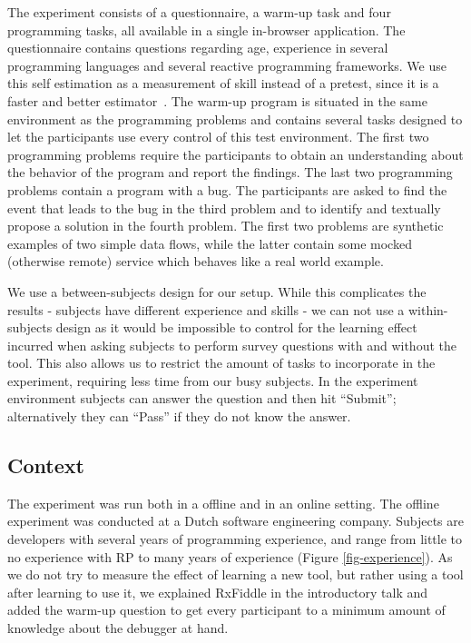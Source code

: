 The experiment consists of a questionnaire, a warm-up task and four programming tasks, all available in a single in-browser application. The questionnaire contains questions regarding age, experience in several programming languages and several reactive programming frameworks. We use this self estimation as a measurement of skill instead of a pretest, since it is a faster and better estimator~\cite{kleinschmager2011rate,feigenspan2012measuring,siegmund2014measuring}. The warm-up program is situated in the same environment as the programming problems and contains several tasks designed to let the participants use every control of this test environment. The first two programming problems require the participants to obtain an understanding about the behavior of the program and report the findings. The last two programming problems contain a program with a bug. The participants are asked to find the event that leads to the bug in the third problem and to identify and textually propose a solution in the fourth problem. The first two problems are synthetic examples of two simple data flows, while the latter contain some mocked (otherwise remote) service which behaves like a real world example.

We use a between-subjects design for our setup. While this complicates the results - subjects have different experience and skills - we can not use a within-subjects design as it would be impossible to control for the learning effect incurred when asking subjects to perform survey questions with and without the tool. This also allows us to restrict the amount of tasks to incorporate in the experiment, requiring less time from our busy subjects.
In the experiment environment subjects can answer the question and then hit ``Submit''; alternatively they can ``Pass'' if they do not know the answer.


\subsection{Context}
The experiment was run both in a offline and in an online setting.
The offline experiment was conducted at a Dutch software engineering company. Subjects are developers with several years of programming experience, and range from little to no experience with RP to many years of experience (Figure \ref{fig-experience}).
As we do not try to measure the effect of learning a new tool, but rather using a tool after learning to use it, we explained RxFiddle in the introductory talk and added the warm-up question to get every participant to a minimum amount of knowledge about the debugger at hand.

